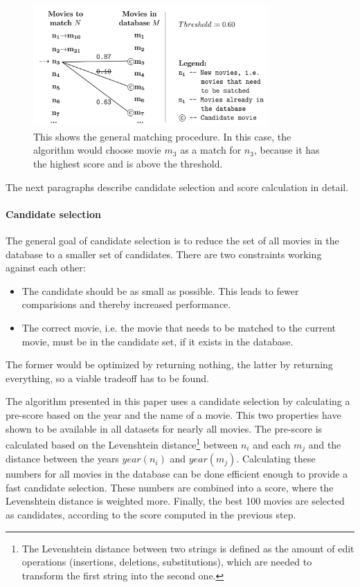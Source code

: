 \begin{figure}[ht]
  \begin{center}
  \includegraphics[width=0.8\textwidth]{images/matching_general.pdf}
  \end{center}
  \caption{This shows the general matching procedure. In this case, the algorithm would choose movie $m_3$ as a match for $n_3$, because it has the highest score and is above the threshold.}
  \label{fig_matching_general}
\end{figure}

The next paragraphs describe candidate selection and score calculation in detail.

\paragraph{Candidate selection}

The general goal of candidate selection is to reduce the set of all movies in the database to a smaller set of candidates.
There are two constraints working against each other:
\begin{itemize}
	\item The candidate should be as small as possible. This leads to fewer comparisions and thereby increased performance.
	\item The correct movie, i.e. the movie that needs to be matched to the current movie, must be in the candidate set, if it exists in the database.
\end{itemize}
The former would be optimized by returning nothing, the latter by returning everything, so a viable tradeoff has to be found.

The algorithm presented in this paper uses a candidate selection by calculating a pre-score based on the year and the name of a movie.
This two properties have shown to be available in all datasets for nearly all movies.
The pre-score is calculated based on the Levenshtein distance\footnote{The Levenshtein distance between two strings is defined as the amount of edit operations (insertions, deletions, substitutions), which are needed to transform the first string into the second one.} between $n_i$ and each $m_j$ and the distance between the years $year(n_i)$ and $year(m_j)$.
Calculating these numbers for all movies in the database can be done efficient enough to provide a fast candidate selection.
These numbers are combined into a score, where the Levenshtein distance is weighted more.
Finally, the best 100 movies are selected as candidates, according to the score computed in the previous step.

